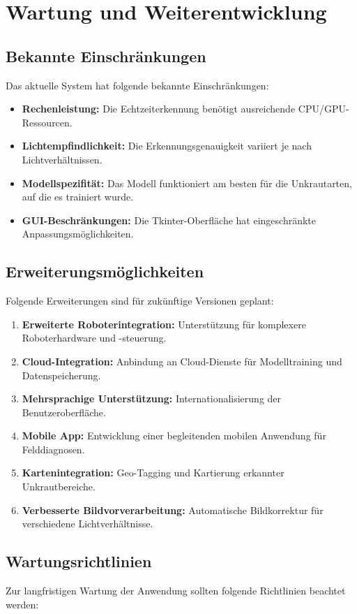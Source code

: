 \documentclass[12pt, a4paper]{scrreprt}
\begin{document}
\chapter{Wartung und Weiterentwicklung}

\section{Bekannte Einschränkungen}
Das aktuelle System hat folgende bekannte Einschränkungen:

\begin{itemize}
    \item \textbf{Rechenleistung:} Die Echtzeiterkennung benötigt ausreichende CPU/GPU-Ressourcen.
    \item \textbf{Lichtempfindlichkeit:} Die Erkennungsgenauigkeit variiert je nach Lichtverhältnissen.
    \item \textbf{Modellspezifität:} Das Modell funktioniert am besten für die Unkrautarten, auf die es trainiert wurde.
    \item \textbf{GUI-Beschränkungen:} Die Tkinter-Oberfläche hat eingeschränkte Anpassungsmöglichkeiten.
\end{itemize}

\section{Erweiterungsmöglichkeiten}
Folgende Erweiterungen sind für zukünftige Versionen geplant:

\begin{enumerate}
    \item \textbf{Erweiterte Roboterintegration:} Unterstützung für komplexere Roboterhardware und -steuerung.
    \item \textbf{Cloud-Integration:} Anbindung an Cloud-Dienste für Modelltraining und Datenspeicherung.
    \item \textbf{Mehrsprachige Unterstützung:} Internationalisierung der Benutzeroberfläche.
    \item \textbf{Mobile App:} Entwicklung einer begleitenden mobilen Anwendung für Felddiagnosen.
    \item \textbf{Kartenintegration:} Geo-Tagging und Kartierung erkannter Unkrautbereiche.
    \item \textbf{Verbesserte Bildvorverarbeitung:} Automatische Bildkorrektur für verschiedene Lichtverhältnisse.
\end{enumerate}

\section{Wartungsrichtlinien}
Zur langfristigen Wartung der Anwendung sollten folgende Richtlinien beachtet werden:
\end{document}
